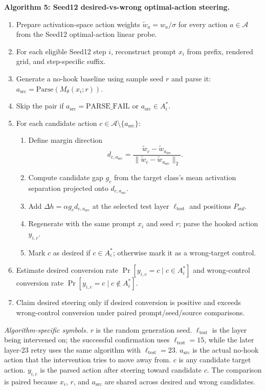 \documentclass[11pt]{article}
\begin{document}
\medskip
\noindent\textbf{Algorithm 5: Seed12 desired-vs-wrong optimal-action steering.}
\begin{enumerate}[leftmargin=*,itemsep=1pt,topsep=2pt]
  \item Prepare activation-space action weights $\tilde{w}_a=w_a/\sigma$ for every action $a\in\mathcal{A}$ from the Seed12 optimal-action linear probe.
  \item For each eligible Seed12 step $i$, reconstruct prompt $x_i$ from prefix, rendered grid, and step-specific suffix.
  \item Generate a no-hook baseline using sample seed $r$ and parse it: $a_{\mathrm{src}}=\mathrm{Parse}(M_\theta(x_i;r))$.
  \item Skip the pair if $a_{\mathrm{src}}=\mathrm{PARSE\_FAIL}$ or $a_{\mathrm{src}}\in A_i^*$.
  \item For each candidate action $c\in\mathcal{A}\setminus\{a_{\mathrm{src}}\}$:
    \begin{enumerate}[leftmargin=1.5em,itemsep=1pt,topsep=1pt]
      \item Define margin direction
      \[
        d_{c,a_{\mathrm{src}}}
        =
        \frac{\tilde{w}_c-\tilde{w}_{a_{\mathrm{src}}}}
        {\|\tilde{w}_c-\tilde{w}_{a_{\mathrm{src}}}\|_2}.
      \]
      \item Compute candidate gap $g_c$ from the target class's mean activation separation projected onto $d_{c,a_{\mathrm{src}}}$.
      \item Add $\Delta h=\alpha g_c d_{c,a_{\mathrm{src}}}$ at the selected test layer $\ell_{\mathrm{test}}$ and positions $P_{\mathrm{suf}}$.
      \item Regenerate with the same prompt $x_i$ and seed $r$; parse the hooked action $y_{i,c}$.
      \item Mark $c$ as desired if $c\in A_i^*$; otherwise mark it as a wrong-target control.
    \end{enumerate}
  \item Estimate desired conversion rate $\Pr[y_{i,c}=c\mid c\in A_i^*]$ and wrong-control conversion rate $\Pr[y_{i,c}=c\mid c\notin A_i^*]$.
  \item Claim desired steering only if desired conversion is positive and exceeds wrong-control conversion under paired prompt/seed/source comparisons.
\end{enumerate}
\noindent\emph{Algorithm-specific symbols.}
$r$ is the random generation seed.
$\ell_{\mathrm{test}}$ is the layer being intervened on; the successful confirmation uses $\ell_{\mathrm{test}}=15$, while the later layer-23 retry uses the same algorithm with $\ell_{\mathrm{test}}=23$.
$a_{\mathrm{src}}$ is the actual no-hook action that the intervention tries to move away from.
$c$ is any candidate target action.
$y_{i,c}$ is the parsed action after steering toward candidate $c$.
The comparison is paired because $x_i$, $r$, and $a_{\mathrm{src}}$ are shared across desired and wrong candidates.
\end{document}
